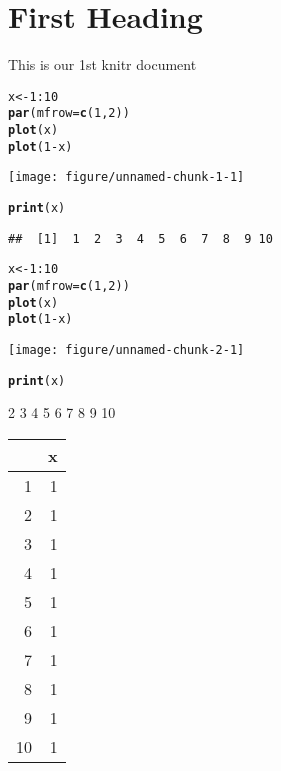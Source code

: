 \documentclass{article}\usepackage[]{graphicx}\usepackage[]{color}
\makeatletter
\def\maxwidth{ %
  \ifdim\Gin@nat@width>\linewidth
    \linewidth
  \else
    \Gin@nat@width
  \fi
}
\newcommand{\hlnum}[1]{\textcolor[rgb]{0.686,0.059,0.569}{#1}}%
\newcommand{\hlopt}[1]{\textcolor[rgb]{0,0,0}{#1}}%
\newcommand{\hlstd}[1]{\textcolor[rgb]{0.345,0.345,0.345}{#1}}%
\newcommand{\hlkwb}[1]{\textcolor[rgb]{0.69,0.353,0.396}{#1}}%
\newcommand{\hlkwc}[1]{\textcolor[rgb]{0.333,0.667,0.333}{#1}}%
\newcommand{\hlkwd}[1]{\textcolor[rgb]{0.737,0.353,0.396}{\textbf{#1}}}%
\newenvironment{kframe}{%
 \def\at@end@of@kframe{}%
 \ifinner\ifhmode%
  \def\at@end@of@kframe{\end{minipage}}%
  \begin{minipage}{\columnwidth}%
 \fi\fi%
 \def\FrameCommand##1{\hskip\@totalleftmargin \hskip-\fboxsep
 \colorbox{shadecolor}{##1}\hskip-\fboxsep
     \hskip-\linewidth \hskip-\@totalleftmargin \hskip\columnwidth}%
 \MakeFramed {\advance\hsize-\width
   \@totalleftmargin\z@ \linewidth\hsize
   \@setminipage}}%
 {\par\unskip\endMakeFramed%
 \at@end@of@kframe}
\newenvironment{knitrout}{}{} %
\makeatother
\begin{document}
\section{First Heading}

This is our 1st knitr document

\begin{knitrout}
\color{fgcolor}\begin{kframe}
\begin{alltt}
\hlstd{x} \hlkwb{<-} \hlnum{1}\hlopt{:}\hlnum{10}
\hlkwd{par}\hlstd{(}\hlkwc{mfrow} \hlstd{=} \hlkwd{c}\hlstd{(}\hlnum{1}\hlstd{,} \hlnum{2}\hlstd{))}
\hlkwd{plot}\hlstd{(x)}
\hlkwd{plot}\hlstd{(}\hlnum{1}\hlopt{-}\hlstd{x)}
\end{alltt}
\end{kframe}
\texttt{[image: figure/unnamed-chunk-1-1]} 
\begin{kframe}\begin{alltt}
\hlkwd{print}\hlstd{(x)}
\end{alltt}
\begin{verbatim}
##  [1]  1  2  3  4  5  6  7  8  9 10
\end{verbatim}
\end{kframe}
\end{knitrout}

\begin{kframe}
\begin{alltt}
\hlstd{x} \hlkwb{<-} \hlnum{1}\hlopt{:}\hlnum{10}
\hlkwd{par}\hlstd{(}\hlkwc{mfrow} \hlstd{=} \hlkwd{c}\hlstd{(}\hlnum{1}\hlstd{,} \hlnum{2}\hlstd{))}
\hlkwd{plot}\hlstd{(x)}
\hlkwd{plot}\hlstd{(}\hlnum{1}\hlopt{-}\hlstd{x)}
\end{alltt}
\end{kframe}
\texttt{[image: figure/unnamed-chunk-2-1]} 
\begin{kframe}\begin{alltt}
\hlkwd{print}\hlstd{(x)}
\end{alltt}
\end{kframe} [1]  1  2  3  4  5  6  7  8  9 10





\begin{table}[ht]
\centering
\begin{tabular}{rr}
  \hline
 & x \\ 
  \hline
1 &   1 \\ 
  2 &   1 \\ 
  3 &   1 \\ 
  4 &   1 \\ 
  5 &   1 \\ 
  6 &   1 \\ 
  7 &   1 \\ 
  8 &   1 \\ 
  9 &   1 \\ 
  10 &   1 \\ 
   \hline
\end{tabular}
\end{table}
\end{document}
